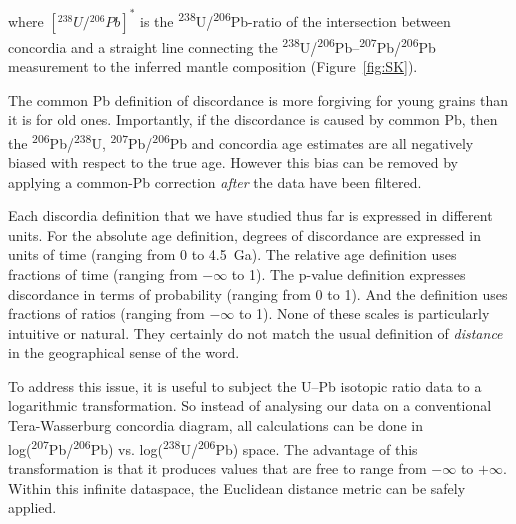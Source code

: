 \documentclass[gchron, manuscript]{copernicus}
\begin{document}
\noindent where $[{}^{238}U/{}^{206}Pb]^\ast$ is the
\textsuperscript{238}U/\textsuperscript{206}Pb-ratio of the
intersection between concordia and a straight line connecting the
\textsuperscript{238}U/\textsuperscript{206}Pb--\textsuperscript{207}Pb/\textsuperscript{206}Pb
measurement to the inferred mantle composition (Figure~\ref{fig:SK}).

The common Pb definition of discordance is more forgiving for young
grains than it is for old ones. Importantly, if the discordance is
caused by common Pb, then the
\textsuperscript{206}Pb/\textsuperscript{238}U,
\textsuperscript{207}Pb/\textsuperscript{206}Pb and concordia age
estimates are all negatively biased with respect to the true
age. However this bias can be removed by applying a common-Pb
correction \emph{after} the data have been filtered.

Each discordia definition that we have studied thus far is expressed
in different units. For the absolute age definition, degrees of
discordance are expressed in units of time (ranging from 0 to
4.5~Ga). The relative age definition uses fractions of time (ranging
from $-\infty$ to 1). The p-value definition expresses discordance in
terms of probability (ranging from 0 to 1). And the \citet{stacey1975}
definition uses fractions of ratios (ranging from $-\infty$ to
1). None of these scales is particularly intuitive or natural. They
certainly do not match the usual definition of \emph{distance} in the
geographical sense of the word.

To address this issue, it is useful to subject the U--Pb isotopic
ratio data to a logarithmic transformation. So instead of analysing
our data on a conventional Tera-Wasserburg concordia diagram, all
calculations can be done in
log(\textsuperscript{207}Pb/\textsuperscript{206}Pb) vs.
log(\textsuperscript{238}U/\textsuperscript{206}Pb) space. The
advantage of this transformation is that it produces values that are
free to range from $-\infty$ to $+\infty$. Within this infinite
dataspace, the Euclidean distance metric can be safely applied.
\end{document}
